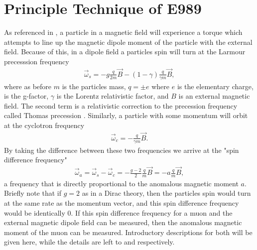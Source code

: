 
\thispagestyle{myheadings}

\graphicspath{{Body/Figures/ExperimentalOverview/Decay/}{Body/Figures/TrackingFigures/TrackerPics/}{Body/Figures/ExperimentalOverview/Ring/}{Body/Figures/ExperimentalOverview/Auxiliary/}}

\chapter{Principle Technique of E989}
\label{chapter:E989}

As referenced in , a particle in a magnetic field will experience a torque which attempts to line up the magnetic dipole moment of the particle with the external field. Because of this, in a dipole field a particles spin will turn at the Larmour precesssion frequency \cite{Jackson}
        \begin{align} \label{eq:ws}
            \vec{\omega}_{s} = -g\frac{q}{2m}\vec{B} - (1-\gamma)\frac{q}{\gamma m}\vec{B},
        \end{align}
where as before $m$ is the particles mass, $q = \pm e$ where $e$ is the elementary charge, \g is the g-factor, $\gamma$ is the Lorentz relativistic factor, and $B$ is an external magnetic field. The second term is a relativistic correction to the precession frequency called Thomas precession \cite{Jackson}. Similarly, a particle with some momentum will orbit at the cyclotron frequency
        \begin{align} \label{eq:wc}
            \vec{\omega}_{c} = -\frac{q}{\gamma m}\vec{B}.
        \end{align}
By taking the difference between these two frequencies we arrive at the "spin difference frequency"
        \begin{align} \label{eq:wasimple}
            \vec{\omega}_{a} = \vec{\omega}_{s} - \vec{\omega}_{c} = -\frac{g-2}{2}\frac{q}{m}\vec{B} = - a \frac{q}{m}\vec{B},
        \end{align}
a frequency that is directly proportional to the anomalous magnetic moment $a$. Briefly note that if $g = 2$ as in a Dirac theory, then the particles spin would turn at the same rate as the momentum vector, and this spin difference frequency \wa would be identically 0. If this spin difference frequency for a muon and the external magnetic dipole field can be measured, then the anomalous magnetic moment of the muon \amu can be measured. Introductory descriptions for both will be given here, while the details are left to  and 
 respectively.


